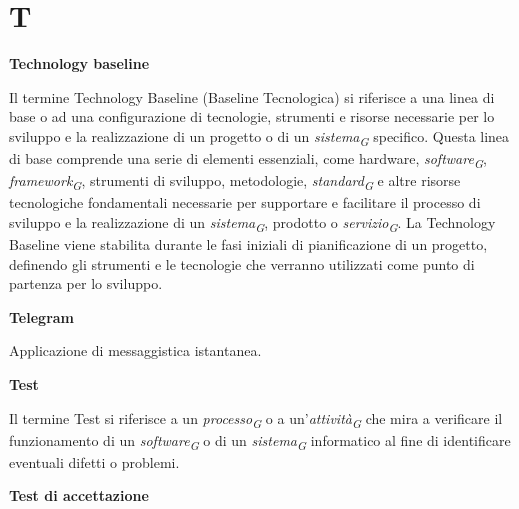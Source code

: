 \documentclass{article}
\begin{document}
\pagebreak
\section*{T}
{}

\vspace{0.4cm}

\textbf{Technology baseline}

\vspace{0.1cm}

Il termine Technology Baseline (Baseline Tecnologica) si riferisce a una linea di base o ad una configurazione di tecnologie, strumenti e risorse necessarie per lo sviluppo e la realizzazione di un progetto o di un \textit{sistema}\textsubscript{\textit{G}} specifico. Questa linea di base comprende una serie di elementi essenziali, come hardware, \textit{software}\textsubscript{\textit{G}}, \textit{framework}\textsubscript{\textit{G}}, strumenti di sviluppo, metodologie, \textit{standard}\textsubscript{\textit{G}} e altre risorse tecnologiche fondamentali necessarie per supportare e facilitare il processo di sviluppo e la realizzazione di un \textit{sistema}\textsubscript{\textit{G}}, prodotto o \textit{servizio}\textsubscript{\textit{G}}. La Technology Baseline viene stabilita durante le fasi iniziali di pianificazione di un progetto, definendo gli strumenti e le tecnologie che verranno utilizzati come punto di partenza per lo sviluppo.

\vspace{0.4cm}

\textbf{Telegram}

\vspace{0.1cm}

Applicazione di messaggistica istantanea.

\vspace{0.4cm}

\textbf{Test}

\vspace{0.1cm}

Il termine Test si riferisce a un \textit{processo}\textsubscript{\textit{G}} o a un'\textit{attività}\textsubscript{\textit{G}} che mira a verificare il funzionamento di un \textit{software}\textsubscript{\textit{G}} o di un \textit{sistema}\textsubscript{\textit{G}} informatico al fine di identificare eventuali difetti o problemi.

\vspace{0.4cm}

\textbf{Test di accettazione}
\end{document}
